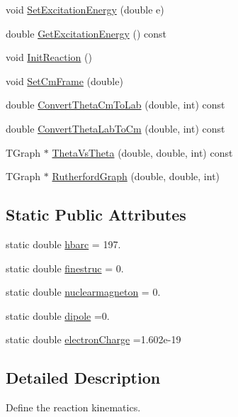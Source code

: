 \begin{DoxyCompactItemize}
\item 
void \hyperlink{classReaction_a844b83a9925e350f2de77c17bdf0a71f}{Set\-Excitation\-Energy} (double e)
\item 
double \hyperlink{classReaction_abf75a7c4f579ef30b8397779fe8add84}{Get\-Excitation\-Energy} () const 
\item 
void \hyperlink{classReaction_aa36161ccf8b40d608e96bfbf47bc5f38}{Init\-Reaction} ()
\item 
void \hyperlink{classReaction_a7bb2c8c05ec7099774042b495761c344}{Set\-Cm\-Frame} (double)
\item 
double \hyperlink{classReaction_a9ad94562bb8fb812c69b9586920c62f3}{Convert\-Theta\-Cm\-To\-Lab} (double, int) const 
\item 
double \hyperlink{classReaction_aba20cd636ca54ead991bbd2af995e241}{Convert\-Theta\-Lab\-To\-Cm} (double, int) const 
\item 
T\-Graph $\ast$ \hyperlink{classReaction_a963c2db5f2690e76497c9df4cbbde1ea}{Theta\-Vs\-Theta} (double, double, int) const 
\item 
T\-Graph $\ast$ \hyperlink{classReaction_a5be6997bfd61ea2a3cb14efdb72d3b45}{Rutherford\-Graph} (double, double, int)
\end{DoxyCompactItemize}
\subsection*{Static Public Attributes}
\begin{DoxyCompactItemize}
\item 
static double \hyperlink{classReaction_a7312a47fadc4fd628d408a672a7c1249}{hbarc} = 197.
\item 
static double \hyperlink{classReaction_ae5cded739cd4c1b07a79a850c3d83b21}{finestruc} = 0.
\item 
static double \hyperlink{classReaction_adbeaf76ca988330f57ccf5479284c51d}{nuclearmagneton} = 0.
\item 
static double \hyperlink{classReaction_a726225b505e6bad7ee271fd1165e1318}{dipole} =0.
\item 
static double \hyperlink{classReaction_ac1a709b13c8bb45fd259d7bda61343a9}{electron\-Charge} =1.\-602e-\/19
\end{DoxyCompactItemize}


\subsection{Detailed Description}
Define the reaction kinematics. 

